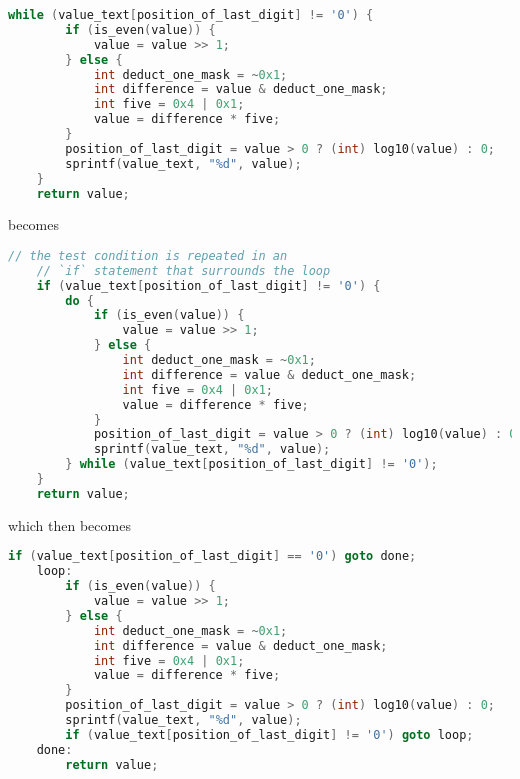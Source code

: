 \documentclass{article}
\begin{document}
\begin{lstlisting}[language=C, linebackgroundcolor={
    %    \ifodd\value{lstnumber}\color{green}\fi
    \ifnum\value{lstnumber}=1 \color{green}\fi,
    \ifnum\value{lstnumber}=12 \color{green}\fi,
}]
    while (value_text[position_of_last_digit] != '0') {
        if (is_even(value)) {
            value = value >> 1;
        } else {
            int deduct_one_mask = ~0x1;
            int difference = value & deduct_one_mask;
            int five = 0x4 | 0x1;
            value = difference * five;
        }
        position_of_last_digit = value > 0 ? (int) log10(value) : 0;
        sprintf(value_text, "%d", value);
    }
    return value;
\end{lstlisting}

becomes

\begin{lstlisting}[language=C, linebackgroundcolor={
    %    \ifodd\value{lstnumber}\color{green}\fi
    \ifnum\value{lstnumber}=3 \color{lime}\fi,
    \ifnum\value{lstnumber}=4 \color{green}\fi,
    \ifnum\value{lstnumber}=15 \color{green}\fi,
    \ifnum\value{lstnumber}=16 \color{lime}\fi,
}]
    // the test condition is repeated in an
    // `if` statement that surrounds the loop
    if (value_text[position_of_last_digit] != '0') {
        do {
            if (is_even(value)) {
                value = value >> 1;
            } else {
                int deduct_one_mask = ~0x1;
                int difference = value & deduct_one_mask;
                int five = 0x4 | 0x1;
                value = difference * five;
            }
            position_of_last_digit = value > 0 ? (int) log10(value) : 0;
            sprintf(value_text, "%d", value);
        } while (value_text[position_of_last_digit] != '0');
    }
    return value;
\end{lstlisting}
\newpage
which then becomes

\begin{lstlisting}[language=C, linebackgroundcolor={
    %    \ifodd\value{lstnumber}\color{green}\fi
    \ifnum\value{lstnumber}=1 \color{lime}\fi,
    \ifnum\value{lstnumber}=2 \color{green}\fi,
    \ifnum\value{lstnumber}=13 \color{green}\fi,
    \ifnum\value{lstnumber}=14 \color{lime}\fi,
}]
        if (value_text[position_of_last_digit] == '0') goto done;
    loop:
        if (is_even(value)) {
            value = value >> 1;
        } else {
            int deduct_one_mask = ~0x1;
            int difference = value & deduct_one_mask;
            int five = 0x4 | 0x1;
            value = difference * five;
        }
        position_of_last_digit = value > 0 ? (int) log10(value) : 0;
        sprintf(value_text, "%d", value);
        if (value_text[position_of_last_digit] != '0') goto loop;
    done:
        return value;
\end{lstlisting}
\end{document}
